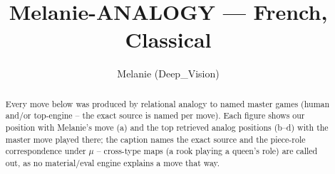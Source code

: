 \documentclass[11pt]{article}
\title{Melanie-ANALOGY — French, Classical}
\author{Melanie (Deep\_Vision)}
\date{}
\begin{document}
\maketitle

\begin{abstract}Every move below was produced by relational analogy to named master games (human and/or top-engine -- the exact source is named per move). Each figure shows our position with Melanie's move (a) and the top retrieved analog positions (b--d) with the master move played there; the caption names the exact source and the piece-role correspondence under $\mu$ -- cross-type maps (a rook playing a queen's role) are called out, as no material/eval engine explains a move that way.\end{abstract}

\begin{figure}[p]\centering
\begin{subfigure}{0.46\textwidth}\centering
\resizebox{\linewidth}{!}{%
\newchessgame
\chessboard[
  setfen={rnb1k2r/pppnqppp/4p3/3pP3/3P3P/2N5/PPP2PP1/R2QKBNR b KQkq - 0 7},
  showmover=false,
  pgfstyle=straightmove, color=movearrow, markmove={e7-b4}
]}
\caption{}
\end{subfigure}\hfill
\begin{subfigure}{0.46\textwidth}\centering
\resizebox{\linewidth}{!}{%
\newchessgame
\chessboard[
  setfen={rnbqk2r/pppn1ppp/4p3/3pP1P1/3P4/2N5/PPP2PP1/R2QKBNR b KQkq - 0 7},
  showmover=false,
  pgfstyle=straightmove, color=movearrow, markmove={d8-g5}
]}
\caption{}
\end{subfigure}
\\[4pt]
\begin{subfigure}{0.46\textwidth}\centering
\resizebox{\linewidth}{!}{%
\newchessgame
\chessboard[
  setfen={rnbqk2r/pppn1ppp/4p3/3pP1P1/3P4/2N5/PPP2PP1/R2QKBNR b KQkq - 0 7},
  showmover=false,
  pgfstyle=straightmove, color=movearrow, markmove={d8-g5}
]}
\caption{}
\end{subfigure}\hfill
\begin{subfigure}{0.46\textwidth}\centering
\resizebox{\linewidth}{!}{%
\newchessgame
\chessboard[
  setfen={rnbqk2r/pppn1ppp/4p3/3pP1P1/3P4/2N5/PPP2PP1/R2QKBNR b KQkq - 0 7},
  showmover=false,
  pgfstyle=straightmove, color=movearrow, markmove={d8-g5}
]}
\caption{}
\end{subfigure}

\end{figure}
\end{document}
